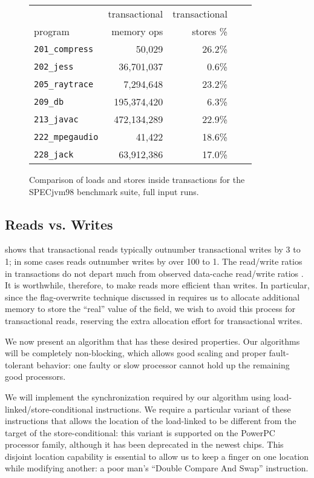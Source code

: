 \documentclass{csa-sig-alternate}
\begin{document}
\begin{figure}
\begin{center}
\begin{tabular}{lrrrr}
        & transactional & transactional\\
program & memory ops    & stores \% \\\hline
{\tt 201\_compress} & 50,029 & 26.2\% \\
{\tt 202\_jess} & 36,701,037 & 0.6\% \\
{\tt 205\_raytrace} & 7,294,648 & 23.2\% \\
{\tt 209\_db} & 195,374,420 & 6.3\% \\
{\tt 213\_javac} & 472,134,289 & 22.9\% \\
{\tt 222\_mpegaudio} & 41,422 & 18.6\% \\
{\tt 228\_jack} & 63,912,386 & 17.0\% \\
\end{tabular}
\end{center}
\figadjust%
\caption{Comparison of loads and stores inside transactions for the
  SPECjvm98 benchmark suite, full input runs.}
\label{fig:writepercent}
\end{figure}
\subsection{Reads vs. Writes}
 shows that transactional reads typically
outnumber transactional writes by 3 to 1; in some cases reads
outnumber writes by over 100 to 1.  The read/write ratios in
transactions do not depart much from observed
data-cache read/write ratios \cite[pp. 105, 379]{Hennessy96}.
It is worthwhile, therefore, to
make reads more efficient than writes.  In particular, since the
flag-overwrite technique discussed in  requires us
to allocate additional memory to store the ``real'' value of the
field, we wish to avoid this process for transactional reads,
reserving the extra allocation effort for transactional writes.

We now present an algorithm that has these desired properties.
Our algorithms will be completely non-blocking, which allows good
scaling and proper fault-tolerant behavior: one faulty or slow
processor cannot hold up the remaining good processors.

We will implement the synchronization required by our algorithm using
load-linked/store-conditional instructions.  We require a particular
variant of these instructions that allows the location of the
load-linked to be different from the target of the store-conditional:
this variant is supported on the PowerPC processor family, although it
has been deprecated in the newest chips.  This disjoint location
capability is essential to allow us to keep a finger on one location
while modifying another: a poor man's ``Double Compare And Swap''
instruction.
\end{document}
